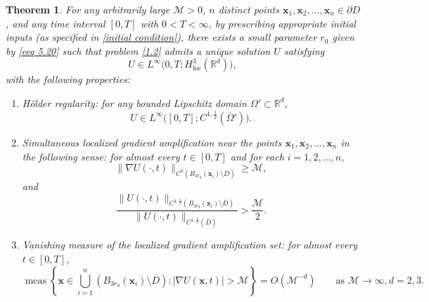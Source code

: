 \documentclass[11pt,reqno,oneside]{amsart}
\numberwithin{equation}{section}
\newtheorem{theorem}{Theorem}[section]
\theoremstyle{definition}
\theoremstyle{remark}
\numberwithin{equation}{section}
\begin{document}
\begin{theorem}\label{thm:main2}
For any arbitrarily large $\mathcal{M} > 0$, $n$ distinct points $\mathbf{x}_1,\mathbf{x}_2,\ldots,\mathbf{x}_n \in \partial D$, and any time interval $[0,T]$ with $0 < T < \infty$, by prescribing appropriate initial inputs (as specified in \eqref{initial condition}), there exists a small parameter $r_0$ given by \eqref{eeq 5.20} such that problem \eqref{1.2} admits a unique solution $U$ satisfying
\[
U \in L^{\infty}\big(0,T;H^{3}_{\mathrm{loc}}(\mathbb{R}^d)\big),
\]
with the following properties:
\begin{enumerate}
    \item \textit{H\"older regularity}: for any bounded Lipschitz domain $\Omega' \subset \mathbb{R}^d$,
    \[
    U \in L^{\infty}\big([0,T]; C^{1,\frac{1}{2}}(\overline{\Omega}')\big).
    \]

    \item \textit{Simultaneous localized gradient amplification near the points}
    $\mathbf{x}_1,\mathbf{x}_2,\ldots,\mathbf{x}_n$ \textit{in the following sense}: for almost every $t \in [0,T]$ and for each $i=1,2,\ldots,n$,
    \begin{equation*}
        \|\nabla U(\cdot,t)\|_{C^{0}\!\left(B_{3r_0}(\mathbf{x}_i)\setminus\overline{D}\right)}
        \ge \mathcal{M},
    \end{equation*}
    and
    \begin{equation*}
        \frac{\|U(\cdot,t)\|_{C^{1,\frac12}\!\left(B_{3r_0}(\mathbf{x}_i)\setminus\overline{D}\right)}}
        {\|U(\cdot,t)\|_{C^{1,\frac12}(\overline{D})}}
        > \frac{\mathcal{M}}{2}.
    \end{equation*}

    \item \textit{Vanishing measure of the localized gradient amplification set}: for almost every $t \in [0,T]$,
    \begin{equation*}
        \operatorname{meas}\left\{
        \mathbf{x} \in \bigcup_{i=1}^{n}\left(B_{3r_0}(\mathbf{x}_i)\setminus \overline{D}\right)
        : |\nabla U(\mathbf{x},t)| > \mathcal{M}
        \right\}
        = O(\mathcal{M}^{-d})
        \qquad \text{as } \mathcal{M}\to\infty,d=2, 3.
    \end{equation*}
\end{enumerate}
\end{theorem}
\end{document}
